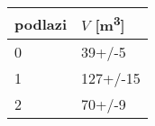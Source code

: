 \begin{tabular}{ll}
\toprule
podlazi & $V$ [\si{m^3}] \\
\midrule
0 &         39+/-5 \\
1 &       127+/-15 \\
2 &         70+/-9 \\
\bottomrule
\end{tabular}

